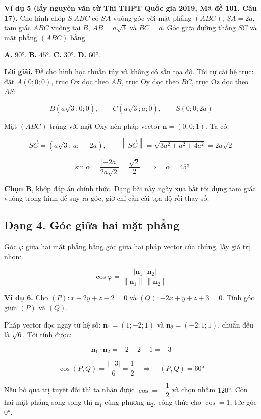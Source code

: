\documentclass[12pt,a4paper]{article}
\begin{document}
\textbf{Ví dụ 5 (lấy nguyên văn từ Thi THPT Quốc gia 2019, Mã đề 101, Câu 17).} Cho hình chóp $S.ABC$ có $SA$ vuông góc với mặt phẳng $(ABC)$, $SA = 2a$, tam giác $ABC$ vuông tại $B$, $AB = a\sqrt{3}$ và $BC = a$. Góc giữa đường thẳng $SC$ và mặt phẳng $(ABC)$ bằng

\textbf{A.} $90°$. \qquad \textbf{B.} $45°$. \qquad \textbf{C.} $30°$. \qquad \textbf{D.} $60°$.

\textbf{Lời giải.} Đề cho hình học thuần túy và không có sẵn tọa độ. Tôi tự cài hệ trục: đặt $A(0;0;0)$, trục Ox dọc theo $AB$, trục Oy dọc theo $BC$, trục Oz dọc theo $AS$:

$$
B(a\sqrt{3};0;0), \qquad C(a\sqrt{3};a;0), \qquad S(0;0;2a)
$$

Mặt $(ABC)$ trùng với mặt Oxy nên pháp vector $\mathbf{n}=(0;0;1)$. Ta có:

$$
\overrightarrow{SC} = (a\sqrt{3};\,a;\,-2a),
\qquad
\left\|\overrightarrow{SC}\right\| = \sqrt{3a^2+a^2+4a^2} = 2a\sqrt{2}
$$

$$
\sin\alpha = \frac{|-2a|}{2a\sqrt{2}} = \frac{\sqrt{2}}{2}
\quad\Longrightarrow\quad
\alpha = 45°
$$

\textbf{Chọn B}, khớp đáp án chính thức. Dạng bài này ngày xưa bắt tôi dựng tam giác vuông trong hình để suy ra góc, giờ chỉ cần cài tọa độ rồi thay số.

\subsection*{Dạng 4. Góc giữa hai mặt phẳng}

Góc $\varphi$ giữa hai mặt phẳng bằng góc giữa hai pháp vector của chúng, lấy giá trị nhọn:

$$
\cos\varphi = \frac{|\mathbf{n}_1 \cdot \mathbf{n}_2|}{\|\mathbf{n}_1\|\,\|\mathbf{n}_2\|}
$$

\textbf{Ví dụ 6.} Cho $(P): x - 2y + z - 2 = 0$ và $(Q): -2x + y + z + 3 = 0$. Tính góc giữa $(P)$ và $(Q)$.

Pháp vector đọc ngay từ hệ số: $\mathbf{n}_1 = (1;-2;1)$ và $\mathbf{n}_2 = (-2;1;1)$, chuẩn đều là $\sqrt{6}$. Tôi tính được:

$$
\mathbf{n}_1\cdot\mathbf{n}_2 = -2-2+1 = -3
$$

$$
\cos(P,Q) = \frac{|-3|}{6} = \frac{1}{2}
\quad\Longrightarrow\quad
(P,Q) = 60°
$$

Nếu bỏ qua trị tuyệt đối thì ta nhận được $\cos=-\dfrac{1}{2}$ và chọn nhầm $120°$. Còn hai mặt phẳng song song thì $\mathbf{n}_1$ cùng phương $\mathbf{n}_2$, công thức cho $\cos=1$, tức góc $0°$.
\end{document}
